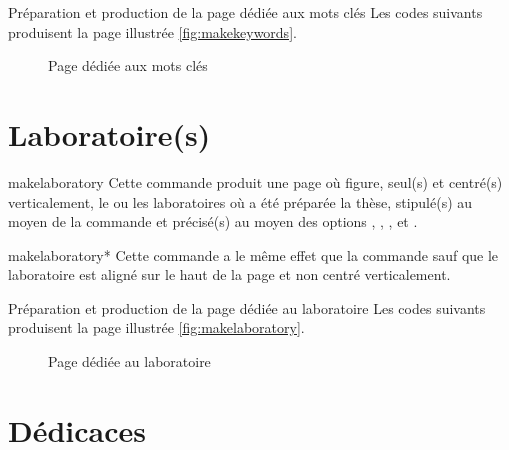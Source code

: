 \begin{dbexample}{Préparation et production de la page dédiée aux mots clés}{}
  Les codes suivants produisent la page illustrée \vref{fig:makekeywords}.
%
\end{dbexample}

\begin{figure}[htbp]
  \centering {}%
  \caption{Page dédiée aux mots clés}
  \label{fig:makekeywords}
\end{figure}

\section{Laboratoire(s)}
\label{sec:laboratoires}

\begin{docCommand}{makelaboratory}{}
  Cette commande produit une page où figure, seul(s) et centré(s)
  verticalement, le ou les laboratoires où a été préparée la thèse, stipulé(s)
  au moyen de la commande  et précisé(s) au moyen des
  options , , , 
  et .
\end{docCommand}
%
\begin{docCommand}{makelaboratory*}{}
  Cette commande a le même effet que la commande
   sauf que le laboratoire est aligné sur le haut de la
  page et non centré verticalement.
\end{docCommand}

\begin{dbexample}{Préparation et production de la page dédiée au laboratoire}{}
  Les codes suivants produisent la page illustrée \vref{fig:makelaboratory}.
  \NoAutoSpacing%
%
\end{dbexample}

\begin{figure}[htbp]
  \centering {}
  \caption{Page dédiée au laboratoire}
  \label{fig:makelaboratory}
\end{figure}

\section{Dédicaces}

